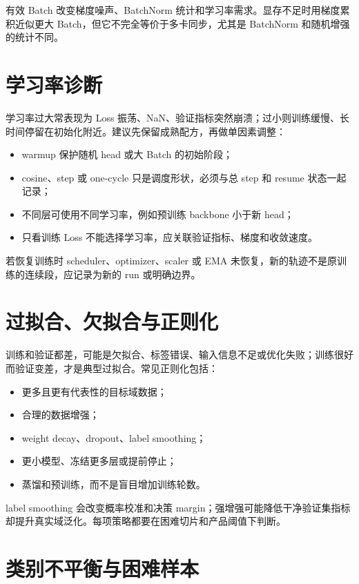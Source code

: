 有效 Batch 改变梯度噪声、BatchNorm 统计和学习率需求。显存不足时用梯度累积近似更大 Batch，但它不完全等价于多卡同步，尤其是 BatchNorm 和随机增强的统计不同。

\section{学习率诊断}

学习率过大常表现为 Loss 振荡、NaN、验证指标突然崩溃；过小则训练缓慢、长时间停留在初始化附近。建议先保留成熟配方，再做单因素调整：

\begin{itemize}
  \item warmup 保护随机 head 或大 Batch 的初始阶段；
  \item cosine、step 或 one-cycle 只是调度形状，必须与总 step 和 resume 状态一起记录；
  \item 不同层可使用不同学习率，例如预训练 backbone 小于新 head；
  \item 只看训练 Loss 不能选择学习率，应关联验证指标、梯度和收敛速度。
\end{itemize}

若恢复训练时 scheduler、optimizer、scaler 或 EMA 未恢复，新的轨迹不是原训练的连续段，应记录为新的 run 或明确边界。

\section{过拟合、欠拟合与正则化}

训练和验证都差，可能是欠拟合、标签错误、输入信息不足或优化失败；训练很好而验证变差，才是典型过拟合。常见正则化包括：

\begin{itemize}
  \item 更多且更有代表性的目标域数据；
  \item 合理的数据增强；
  \item weight decay、dropout、label smoothing；
  \item 更小模型、冻结更多层或提前停止；
  \item 蒸馏和预训练，而不是盲目增加训练轮数。
\end{itemize}

label smoothing 会改变概率校准和决策 margin；强增强可能降低干净验证集指标却提升真实域泛化。每项策略都要在困难切片和产品阈值下判断。

\section{类别不平衡与困难样本}

